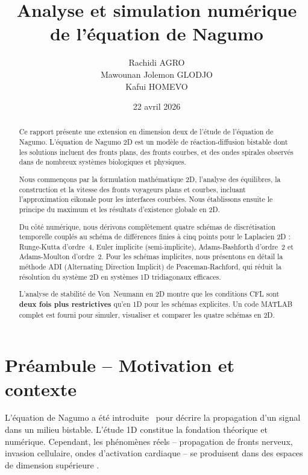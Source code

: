\documentclass[11pt,a4paper]{report}
\title{Analyse et simulation num\'erique de l'\'equation de Nagumo\\
}
\author{Rachidi AGRO \\Mawounan Jolemon GLODJO \\ Kafui HOMEVO}
\date{22 avril 2026}
\begin{document}



\begin{abstract}
Ce rapport pr\'esente une extension en dimension deux de l'\'etude de l'\'equation de Nagumo.
L'\'equation de Nagumo 2D est un mod\`ele de r\'eaction-diffusion bistable dont les solutions
incluent des fronts plans, des fronts courbes, et des ondes spirales observ\'es dans de
nombreux syst\`emes biologiques et physiques.

Nous commen\c{c}ons par la formulation math\'ematique 2D, l'analyse des \'equilibres, la
construction et la vitesse des fronts voyageurs plans et courbes, incluant l'approximation
eikonale pour les interfaces courb\'ees. Nous \'etablissons ensuite le principe du maximum
et les r\'esultats d'existence globale en 2D.

Du c\^ot\'e num\'erique, nous d\'erivons compl\`etement quatre sch\'emas de discr\'etisation
temporelle coupl\'es au sch\'ema de diff\'erences finies \`a cinq points pour le Laplacien
2D : Runge-Kutta d'ordre~4, Euler implicite (semi-implicite), Adams-Bashforth d'ordre~2 et
Adams-Moulton d'ordre~2. Pour les sch\'emas implicites, nous pr\'esentons en d\'etail la
m\'ethode ADI (Alternating Direction Implicit) de Peaceman-Rachford, qui r\'eduit la
r\'esolution du syst\`eme 2D en syst\`emes 1D tridiagonaux efficaces.

L'analyse de stabilit\'e de Von~Neumann en 2D montre que les conditions CFL sont
\textbf{deux fois plus restrictives} qu'en 1D pour les sch\'emas explicites. Un code MATLAB
complet est fourni pour simuler, visualiser et comparer les quatre sch\'emas en 2D.
\end{abstract}

\tableofcontents

\chapter*{Pr\'eambule -- Motivation et contexte}

L'\'equation de Nagumo a \'et\'e introduite~\cite{Nagumo1962} pour d\'ecrire la propagation
d'un signal dans un milieu bistable. L'\'etude 1D constitue la fondation th\'eorique et
num\'erique. Cependant, les ph\'enom\`enes r\'eels -- propagation de fronts nerveux, invasion
cellulaire, ondes d'activation cardiaque -- se produisent dans des espaces de dimension
sup\'erieure \cite{MurrayMathematicalBiology}.
\end{document}
